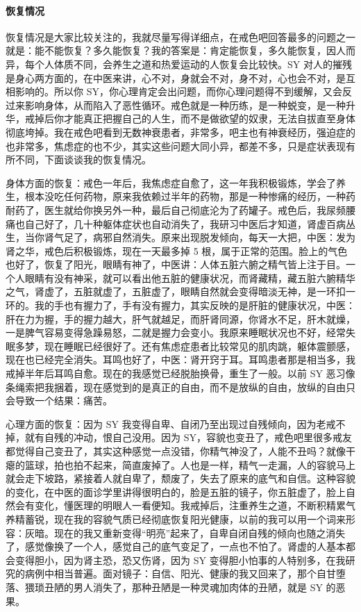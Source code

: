\documentclass{ctexart}
\begin{document}
\paragraph{恢复情况}

恢复情况是大家比较关注的，我就尽量写得详细点，在戒色吧回答最多的问题之一就是：能不能恢复？多久能恢复？我的答案是：肯定能恢复，多久能恢复，因人而异，每个人体质不同，会养生之道和热爱运动的人恢复会比较快。SY 对人的摧残是身心两方面的，在中医来讲，心不对，身就会不对，身不对，心也会不对，是互相影响的。所以你 SY，你心理肯定会出问题，而你心理问题得不到缓解，又会反过来影响身体，从而陷入了恶性循环。戒色就是一种历练，是一种蜕变，是一种升华，戒掉后你才能真正把握自己的人生，而不是做欲望的奴隶，无法自拔直至身体彻底垮掉。我在戒色吧看到无数神衰患者，非常多，吧主也有神衰经历，强迫症的也非常多，焦虑症的也不少，其实这些问题大同小异，都差不多，只是症状表现有所不同，下面谈谈我的恢复情况。

身体方面的恢复：戒色一年后，我焦虑症自愈了，这一年我积极锻炼，学会了养生，根本没吃任何药物，原来我依赖过半年的药物，那是一种惨痛的经历，一种药耐药了，医生就给你换另外一种，最后自己彻底沦为了药罐子。戒色后，我尿频腰痛也自己好了，几十种躯体症状也自动消失了，我研习中医后才知道，肾虚百病丛生，当你肾气足了，病邪自然消失。原来出现脱发倾向，每天一大把，中医：发为肾之华，戒色后积极锻炼，现在一天最多掉 5 根，属于正常的范围。脸上的气色也好了，恢复了阳光，眼睛有神了，中医讲：人体五脏六腑之精气皆上注于目。一个人眼睛有没有神采，就可以看出他五脏的健康状况，而肾藏精，藏五脏六腑精华之气，肾虚了，五脏就虚了，五脏虚了，眼睛自然就会变得暗淡无神，是一环扣一环的。我的手也有握力了，手有没有握力，其实反映的是肝脏的健康状况，中医：肝在力为握，手的握力越大，肝气就越足，而肝肾同源，你肾水不足，肝木就燥，一是脾气容易变得急躁易怒，二就是握力会变小。我原来睡眠状况也不好，经常失眠多梦，现在睡眠已经很好了。还有焦虑症患者比较常见的肌肉跳，躯体震颤感，现在也已经完全消失。耳鸣也好了，中医：肾开窍于耳。耳鸣患者那是相当多，我戒掉半年后耳鸣自愈。现在的我感觉已经脱胎换骨，重生了一般。以前 SY 恶习像条绳索把我捆着，现在感觉到的是真正的自由，而不是放纵的自由，放纵的自由只会导致一个结果：痛苦。

心理方面的恢复：因为 SY 我变得自卑、自闭乃至出现过自残倾向，因为老戒不掉，就有自残的冲动，恨自己没用。因为 SY，容貌也变丑了，戒色吧里很多戒友都觉得自己变丑了，其实这种感觉一点没错，你精气神没了，人能不丑吗？就像干瘪的篮球，拍也拍不起来，简直废掉了。人也是一样，精气一走漏，人的容貌马上就会走下坡路，紧接着人就自卑了，颓废了，失去了原来的底气和自信。这种容貌的变化，在中医的面诊学里讲得很明白的，脸是五脏的镜子，你五脏虚了，脸上自然会有变化，懂医理的明眼人一看便知。我戒掉后，注重养生之道，不断积精累气养精蓄锐，现在我的容貌气质已经彻底恢复阳光健康，以前的我可以用一个词来形容：灰暗。现在的我又重新变得“明亮”起来了，自卑自闭自残的倾向也随之消失了，感觉像换了一个人，感觉自己的底气变足了，一点也不怕了。肾虚的人基本都会变得胆小，因为肾主恐，恐又伤肾，因为 SY 变得胆小怕事的人特别多，在我研究的病例中相当普遍。面对镜子：自信、阳光、健康的我又回来了，那个自甘堕落、猥琐丑陋的男人消失了，那种丑陋是一种灵魂加肉体的丑陋，就是 SY 的恶果。
\end{document}

